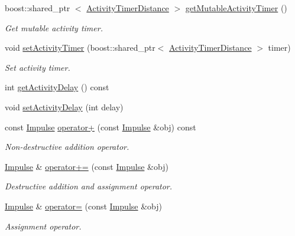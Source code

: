\begin{DoxyCompactItemize}
boost\-::shared\-\_\-ptr\*
$<$ \hyperlink{classcryomesh_1_1components_1_1ActivityTimerDistance}{\-Activity\-Timer\-Distance} $>$ \hyperlink{classcryomesh_1_1components_1_1Impulse_aac5460017f7adceba53aea31b1bc5bfe}{get\-Mutable\-Activity\-Timer} ()
\begin{DoxyCompactList}\small\item\em \-Get mutable activity timer. \end{DoxyCompactList}\item 
void \hyperlink{classcryomesh_1_1components_1_1Impulse_a04ecc67f3bf21f922c29d9e8afd3d04d}{set\-Activity\-Timer} (boost\-::shared\-\_\-ptr$<$ \hyperlink{classcryomesh_1_1components_1_1ActivityTimerDistance}{\-Activity\-Timer\-Distance} $>$ timer)
\begin{DoxyCompactList}\small\item\em \-Set activity timer. \end{DoxyCompactList}\item 
int \hyperlink{classcryomesh_1_1components_1_1Impulse_a6d0fd21f516b5182dd357b59f2112c64}{get\-Activity\-Delay} () const 
\item 
void \hyperlink{classcryomesh_1_1components_1_1Impulse_a800479ed06132eb56d0bc15c8aa40d8a}{set\-Activity\-Delay} (int delay)
\item 
const \hyperlink{classcryomesh_1_1components_1_1Impulse}{\-Impulse} \hyperlink{classcryomesh_1_1components_1_1Impulse_aca088f62a2bf95978952633e530e601c}{operator+} (const \hyperlink{classcryomesh_1_1components_1_1Impulse}{\-Impulse} \&obj) const 
\begin{DoxyCompactList}\small\item\em \-Non-\/destructive addition operator. \end{DoxyCompactList}\item 
\hyperlink{classcryomesh_1_1components_1_1Impulse}{\-Impulse} \& \hyperlink{classcryomesh_1_1components_1_1Impulse_a6f5351eea5c38586fe5bb3092b3626af}{operator+=} (const \hyperlink{classcryomesh_1_1components_1_1Impulse}{\-Impulse} \&obj)
\begin{DoxyCompactList}\small\item\em \-Destructive addition and assignment operator. \end{DoxyCompactList}\item 
\hyperlink{classcryomesh_1_1components_1_1Impulse}{\-Impulse} \& \hyperlink{classcryomesh_1_1components_1_1Impulse_a77e225470110ea77db3969cbaa2e276a}{operator=} (const \hyperlink{classcryomesh_1_1components_1_1Impulse}{\-Impulse} \&obj)
\begin{DoxyCompactList}\small\item\em \-Assignment operator. \end{DoxyCompactList}\item 

\end{DoxyCompactItemize}
